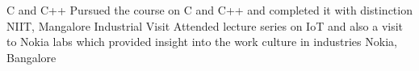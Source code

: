 \begin{cvhonors}
  \cvhonor
    {C and C++}
    {Pursued the course on C and C++ and completed it with distinction}
    {NIIT, Mangalore}
    {}
     \cvhonor
    {Industrial Visit}
    {Attended lecture series on IoT and also a visit to Nokia labs which provided insight into the work culture in industries}
    {Nokia, Bangalore}
    {}
\end{cvhonors}
